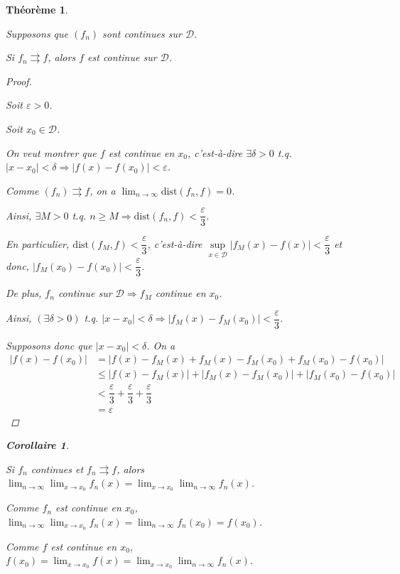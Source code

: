 \documentclass{report}
\newcommand*{\dlim}[3]{\displaystyle\lim_{#1 \to #2}#3}
\newcommand*{\abs}[1]{\left| #1 \right|}
\newcommand*{\convuni}{\rightrightarrows}
\newcommand*{\eps}{\varepsilon}
\newcommand*{\lte}{\leqslant}
\newcommand*{\gte}{\geqslant}
\newtheorem*{thm}{Th\'eor\`eme}
\newtheorem*{coro}{Corollaire}
\theoremstyle{definition}
\theoremstyle{remark}
\begin{document}
	\begin{thm}
		~

		Supposons que $(f_n)$ sont continues sur $\mathcal{D}$.

		Si $f_n \convuni f$, alors $f$ est continue sur $\mathcal{D}$.
		\begin{proof}~

			Soit $\eps>0$.

			Soit $x_0 \in \mathcal{D}$.

			On veut montrer que $f$ est continue en $x_0$, c'est-\`a-dire $\exists\delta>0$ t.q. $\abs{x-x_0}<\delta \Rightarrow \abs{f(x)-f(x_0)}<\eps$.

			Comme $(f_n) \convuni f$, on a $\dlim{n}{\infty}{\mathrm{dist}(f_n,f)}=0$.

			Ainsi, $\exists M>0$ t.q. $n \gte M \Rightarrow \mathrm{dist}(f_n,f) < \dfrac{\eps}{3}$.

			En particulier, $\mathrm{dist}(f_M,f) < \dfrac{\eps}{3}$, c'est-\`a-dire $\sup\limits_{x \in \mathcal{D}}\abs{f_M(x)-f(x)} < \dfrac{\eps}{3}$ et donc, $\abs{f_M(x_0)-f(x_0)} < \dfrac{\eps}{3}$.

			De plus, $f_n$ continue sur $\mathcal{D} \Rightarrow f_M$ continue en $x_0$.

			Ainsi, $(\exists\delta>0)$ t.q. $\abs{x-x_0} < \delta \Rightarrow \abs{f_M(x)-f_M(x_0)} < \dfrac{\eps}{3}$.

			Supposons donc que $\abs{x-x_0} < \delta$. On a
			\begin{align*}
				\abs{f(x)-f(x_0)}&= \abs{f(x) - f_M(x) + f_M(x) - f_M(x_0) + f_M(x_0) - f(x_0)}\\
				&\lte \abs{f(x)-f_M(x)} + \abs{f_M(x)-f_M(x_0)} + \abs{f_M(x_0)-f(x_0)}\\
				&< \dfrac{\eps}{3} + \dfrac{\eps}{3} + \dfrac{\eps}{3}\\
				&= \eps
			\end{align*}
		\end{proof}
		\begin{coro}
			~

			Si $f_n$ continues et $f_n \convuni f$, alors $\dlim{n}{\infty}{\dlim{x}{x_0}{f_n(x)}} = \dlim{x}{x_0}{\dlim{n}{\infty}{f_n(x)}}$.

			Comme $f_n$ est continue en $x_0$, $\dlim{n}{\infty}{\dlim{x}{x_0}{f_n(x)}} = \dlim{n}{\infty}{f_n(x_0)} = f(x_0)$.

			Comme $f$ est continue en $x_0$, $f(x_0) = \dlim{x}{x_0}{f(x)} = \dlim{x}{x_0}{\dlim{n}{\infty}{f_n(x)}}$.
		\end{coro}
	\end{thm}
\end{document}
